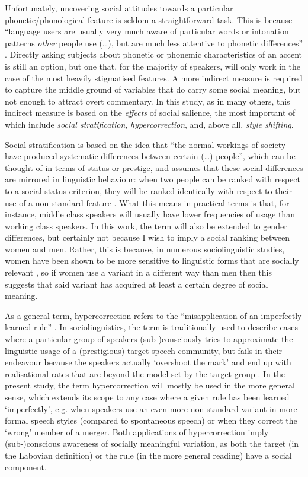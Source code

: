 Unfortunately, uncovering social attitudes towards a particular phonetic/phonological feature is seldom a straightforward task.
This is because ``language users are usually very much aware of particular words or intonation patterns \emph{other} people use (\ldots), but are much less attentive to phonetic differences'' \parencite[3, emphasis in the original]{racz2013}.
Directly asking subjects about phonetic or phonemic characteristics of an accent is still an option, but one that, for the majority of speakers, will only work in the case of the most heavily stigmatised features.
A more indirect measure is required to capture the middle ground of variables that do carry some social meaning, but not enough to attract overt commentary.
In this study, as in many others, this indirect measure is based on the \emph{effects} of social salience, the most important of which include \emph{social stratification}, \emph{hypercorrection}, and, above all, \emph{style shifting}.

Social stratification is based on the idea that ``the normal workings of society have produced systematic differences between certain (\ldots) people'', which can be thought of in terms of status or prestige, and assumes that these social differences are mirrored in linguistic behaviour: when two people can be ranked with respect to a social status criterion, they will be ranked identically with respect to their use of a non-standard feature \parencite[44--45]{labov1972}.
What this means in practical terms is that, for instance, middle class speakers will usually have lower frequencies of usage than working class speakers.
In this work, the term will also be extended to gender differences, but certainly not because I wish to imply a social ranking between women and men.
Rather, this is because, in numerous sociolinguistic studies, women have been shown to be more sensitive to linguistic forms that are socially relevant \parencite[cf.][290--291]{labov2001a}, so if women use a variant in a different way than men then this suggests that said variant has acquired at least a certain degree of social meaning.

As a general term, hypercorrection refers to the ``misapplication of an imperfectly learned rule'' \parencite[126]{labov1972}.
In sociolinguistics, the term is traditionally used to describe cases where a particular group of speakers (sub-)consciously tries to approximate the linguistic usage of a (prestigious) target speech community, but fails in their endeavour because the speakers actually `overshoot the mark' and end up with realisational rates that are beyond the model set by the target group \parencite[cf.][126]{labov1972}.
In the present study, the term hypercorrection will mostly be used in the more general sense, which extends its scope to any case where a given rule has been learned `imperfectly', e.g. when speakers use an even more non-standard variant in more formal speech styles (compared to spontaneous speech) or when they correct the `wrong' member of a merger.
Both applications of hypercorrection imply (sub-)conscious awareness of socially meaningful variation, as both the target (in the Labovian definition) or the rule (in the more general reading) have a social component.

